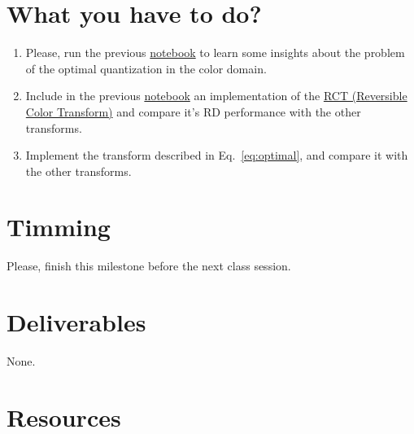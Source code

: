 \section{What you have to do?}

\begin{enumerate}
\item Please, run the previous
  \href{https://github.com/Sistemas-Multimedia/Sistemas-Multimedia.github.io/blob/master/study_guide/06-color_transform/performance.ipynb}{notebook}
  to learn some insights about the problem of the optimal
  quantization in the color domain.
\item Include in the previous
  \href{https://github.com/Sistemas-Multimedia/Sistemas-Multimedia.github.io/blob/master/study_guide/06-color_transform/performance.ipynb}{notebook}
  an implementation of the
  \href{https://en.wikipedia.org/wiki/JPEG_2000#Color_components_transformation}{RCT
    (Reversible Color Transform)} and compare it's RD performance with
  the other transforms.
\item Implement the transform described in Eq.~\ref{eq:optimal}, and
  compare it with the other transforms.
\end{enumerate}

\section{Timming}

Please, finish this milestone before the next class session.

\section{Deliverables}

None.

\section{Resources}

\renewcommand{\addcontentsline}[3]{}%

